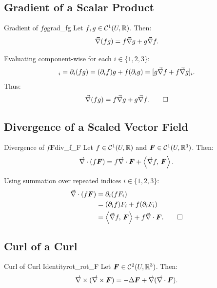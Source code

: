 \subsection{Gradient of a Scalar Product}
\begin{proposition}{Gradient of $fg$}{grad_fg}
Let $f, g \in \mathcal{C}^1(U, \mathbb{R})$. Then:
\begin{equation}
    \vec{\nabla} (fg) = f \vec{\nabla} g + g \vec{\nabla} f.
\end{equation}
\end{proposition}

\begin{demonstration}
Evaluating component-wise for each $i \in \{1, 2, 3\}$:
\begin{equation*}
    [\grad(fg)]_i = \partial_i (fg) = (\partial_i f) g + f (\partial_i g) = [g \grad f + f \grad g]_i.
\end{equation*}
Thus:
\begin{equation*}
    \vec{\nabla}(fg) = f \vec{\nabla} g + g \vec{\nabla} f. \qedhere
\end{equation*}
\end{demonstration}

\subsection{Divergence of a Scaled Vector Field}
\begin{proposition}{Divergence of $f \bm{F}$}{div_f_F}
Let $f \in \mathcal{C}^1(U, \mathbb{R})$ and $\bm{F} \in \mathcal{C}^1(U, \mathbb{R}^3)$. Then:
\begin{equation}
    \vec{\nabla}\cdot (f \bm{F}) = f \vec{\nabla}\cdot \bm{F} + \left\langle \vec{\nabla} f, \, \bm{F} \right\rangle.
\end{equation}
\end{proposition}

\begin{demonstration}
Using summation over repeated indices $i \in \{1, 2, 3\}$:
\begin{align*}
    \vec{\nabla}\cdot (f \bm{F}) &= \partial_i (f F_i) \\
    &= (\partial_i f) F_i + f (\partial_i F_i) \\
    &= \left\langle \vec{\nabla} f, \, \bm{F} \right\rangle + f \vec{\nabla}\cdot \bm{F}. \qedhere
\end{align*}
\end{demonstration}

\subsection{Curl of a Curl}
\begin{proposition}{Curl of Curl Identity}{rot_rot_F}
Let $\bm{F} \in \mathcal{C}^2(U, \mathbb{R}^3)$. Then:
\begin{equation}
    \vec{\nabla}\times (\vec{\nabla}\times \bm{F}) = -\Delta \bm{F} + \vec{\nabla}(\vec{\nabla}\cdot \bm{F}).
\end{equation}
\end{proposition}

